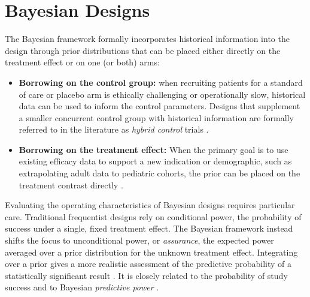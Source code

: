  

\section{Bayesian Designs}
\label{subsec:bayesian_designs_intro}
The Bayesian framework formally incorporates historical information into the design through prior distributions that can be placed either directly
on the treatment effect or on one (or both) arms:

\begin{itemize}
        \item \textbf{Borrowing on the control group:} when recruiting patients for a standard of care or placebo arm is ethically challenging or 
    operationally slow, historical data can be used to inform the control parameters. Designs that supplement a smaller concurrent control group
    with historical information are formally referred to in the literature as \textit{hybrid control} trials \citep{gravestock2017adaptive, gravestock2019power, li2022hybrid, fu2023covariate, kopp2024simulating}.


    \item \textbf{Borrowing on the treatment effect:} When the primary goal is to use existing efficacy data to support a new indication or
    demographic, such as extrapolating adult data to pediatric cohorts, the prior can be placed on the treatment contrast directly \citep{psioda_bayesian_2019}.
\end{itemize}





Evaluating the operating characteristics of Bayesian designs requires particular care. Traditional frequentist designs rely on
conditional power, the probability of success under a single, fixed treatment effect. The Bayesian framework instead shifts the focus
to unconditional power, or \textit{assurance}, the expected power averaged over a prior distribution for the unknown treatment effect.
Integrating over a prior gives a more realistic assessment of the predictive probability of a
statistically significant result \citep{spiegelhalter_predictive_1986, ohagan_assurance_2005}. It is closely related to the probability of study success \citep{wang_evaluating_2013}
and to Bayesian \textit{predictive power} \citep{spiegelhalter_monitoring_1986, micheloud_power_2022}.

